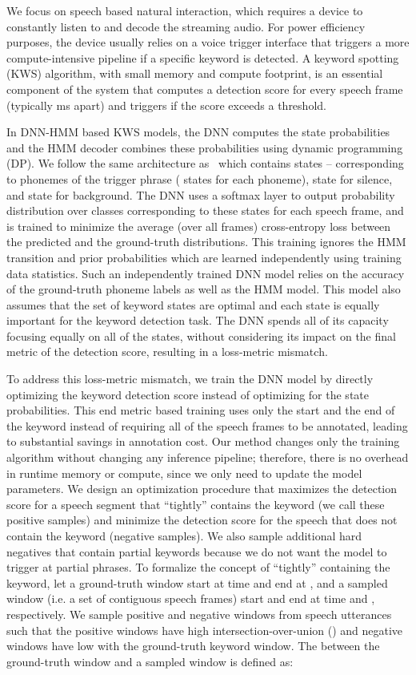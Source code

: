 \documentclass{article}
\begin{document}
We focus on speech based natural interaction, which requires a device to constantly listen to and decode the streaming audio.
For power efficiency purposes, the device usually relies on a voice trigger interface that triggers a more compute-intensive pipeline if a specific keyword is detected.
A keyword spotting (KWS) algorithm, with small memory and compute footprint, is an essential component of the system that computes a detection score for every speech frame (typically ms apart) and triggers if the score exceeds a threshold.

In DNN-HMM based KWS models, the DNN computes the state probabilities and the HMM decoder combines these probabilities using dynamic programming (DP).
We follow the same architecture as~\cite{SigtiaHRMB18} which contains  states --  corresponding to  phonemes of the trigger phrase ( states for each phoneme),  state for silence, and  state for background.
The DNN uses a softmax layer to output probability distribution over  classes corresponding to these  states for each speech frame, and is trained to minimize the average (over all frames) cross-entropy loss between the predicted and the ground-truth distributions.
This training ignores the HMM transition and prior probabilities which are learned independently using training data statistics.
Such an independently trained DNN model relies on the accuracy of the ground-truth phoneme labels as well as the HMM model.
This model also assumes that the set of keyword states are optimal and each state is equally important for the keyword detection task.
The DNN spends all of its capacity focusing equally on all of the states, without considering its impact on the final metric of the detection score, resulting in a loss-metric mismatch.

To address this loss-metric mismatch, we train the DNN model by directly optimizing the keyword detection score instead of optimizing for the state probabilities.
This end metric based training uses only the start and the end of the keyword instead of requiring all of the speech frames to be annotated, leading to substantial savings in annotation cost.
Our method changes only the training algorithm without changing any inference pipeline; therefore, there is no overhead in runtime memory or compute, since we only need to update the model parameters.
We design an optimization procedure that maximizes the detection score for a speech segment that “tightly” contains the keyword (we call these positive samples) and minimize the detection score for the speech that does not contain the keyword (negative samples).
We also sample additional hard negatives that contain partial keywords because we do not want the model to trigger at partial phrases. To formalize the concept of “tightly” containing the keyword, let a ground-truth window start at time  and end at , and a sampled window (i.e. a set of contiguous speech frames) start and end at time  and , respectively.
We sample positive and negative windows from speech utterances such that the positive windows have high intersection-over-union () and negative windows have low  with the ground-truth keyword window.
The  between the ground-truth window  and a sampled window   is defined as:
\end{document}
